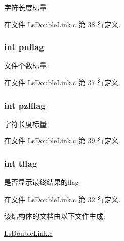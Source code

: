 字符长度标量 



在文件 Ls\-Double\-Link.\-c 第 38 行定义.

\hypertarget{structglobal_args__t_add78a9ef7e3c17ea829b2bd642cb54be}{
\subsubsection[{pnflag}]{\setlength{\rightskip}{0pt plus 5cm}int pnflag}}\label{structglobal_args__t_add78a9ef7e3c17ea829b2bd642cb54be}


文件个数标量 



在文件 Ls\-Double\-Link.\-c 第 37 行定义.

\hypertarget{structglobal_args__t_a96885a7ac3fa5bab18fe2f82df3bc938}{
\subsubsection[{pzlflag}]{\setlength{\rightskip}{0pt plus 5cm}int pzlflag}}\label{structglobal_args__t_a96885a7ac3fa5bab18fe2f82df3bc938}


字符长度标量 



在文件 Ls\-Double\-Link.\-c 第 39 行定义.

\hypertarget{structglobal_args__t_ab3fe9f9160e69ccb1c2ec2762072a6a4}{
\subsubsection[{tflag}]{\setlength{\rightskip}{0pt plus 5cm}int tflag}}\label{structglobal_args__t_ab3fe9f9160e69ccb1c2ec2762072a6a4}


是否显示最终结果的flag 



在文件 Ls\-Double\-Link.\-c 第 32 行定义.



该结构体的文档由以下文件生成\-:\begin{DoxyCompactItemize}
\item 
\hyperlink{_ls_double_link_8c}{Ls\-Double\-Link.\-c}\end{DoxyCompactItemize}
